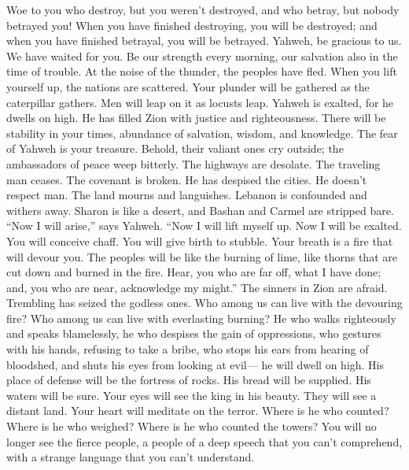  Woe to you who destroy, but you weren't destroyed, and
who betray, but nobody betrayed you! When you have finished destroying,
you will be destroyed; and when you have finished betrayal, you will be
betrayed.  Yahweh, be gracious to us. We have waited for
you. Be our strength every morning, our salvation also in the time of
trouble.  At the noise of the thunder, the peoples have
fled. When you lift yourself up, the nations are scattered.
 Your plunder will be gathered as the caterpillar gathers.
Men will leap on it as locusts leap.  Yahweh is exalted,
for he dwells on high. He has filled Zion with justice and
righteousness.  There will be stability in your times,
abundance of salvation, wisdom, and knowledge. The fear of Yahweh is
your treasure.  Behold, their valiant ones cry outside;
the ambassadors of peace weep bitterly.  The highways are
desolate. The traveling man ceases. The covenant is broken. He has
despised the cities. He doesn't respect man.  The land
mourns and languishes. Lebanon is confounded and withers away. Sharon is
like a desert, and Bashan and Carmel are stripped bare. 
``Now I will arise,'' says Yahweh. ``Now I will lift myself up. Now I
will be exalted.  You will conceive chaff. You will give
birth to stubble. Your breath is a fire that will devour you.
 The peoples will be like the burning of lime, like
thorns that are cut down and burned in the fire.  Hear,
you who are far off, what I have done; and, you who are near,
acknowledge my might.''  The sinners in Zion are afraid.
Trembling has seized the godless ones. Who among us can live with the
devouring fire? Who among us can live with everlasting burning?
 He who walks righteously and speaks blamelessly, he who
despises the gain of oppressions, who gestures with his hands, refusing
to take a bribe, who stops his ears from hearing of bloodshed, and shuts
his eyes from looking at evil---  he will dwell on high.
His place of defense will be the fortress of rocks. His bread will be
supplied. His waters will be sure.  Your eyes will see
the king in his beauty. They will see a distant land. 
Your heart will meditate on the terror. Where is he who counted? Where
is he who weighed? Where is he who counted the towers? 
You will no longer see the fierce people, a people of a deep speech that
you can't comprehend, with a strange language that you can't understand.
